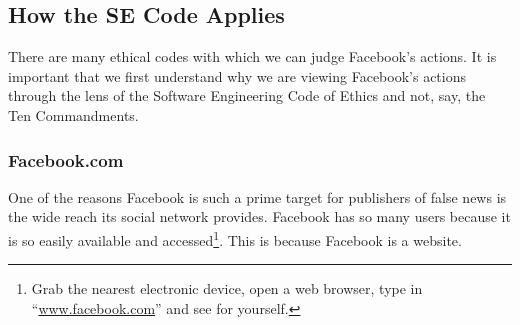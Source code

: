 
\subsection{How the SE Code Applies}

\par There are many ethical codes with which we can judge Facebook's actions. It is important that we first understand why we are viewing Facebook's actions through the lens of the Software Engineering Code of Ethics and not, say, the Ten Commandments.





\subsubsection{Facebook.com}

\par One of the reasons Facebook is such a prime target for publishers of false news is the wide reach its social network provides. \cite{telegraph_fn} Facebook has so many users because it is so easily available and accessed\footnote{Grab the nearest electronic device, open a web browser, type in ``\url{www.facebook.com}'' and see for yourself.}. This is because Facebook is a website.

